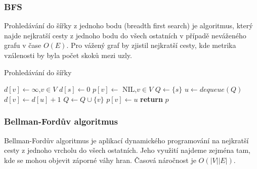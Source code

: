 \documentclass[12pt,titlepage]{report}
\begin{document}
\subsubsection{BFS}
Prohledávání do šířky z jednoho bodu (breadth first search) je algoritmus,
který najde nejkratší cesty z jednoho bodu do všech ostatních v případě
neváženého grafu v čase $O(E)$. Pro vážený graf by zjistil nejkratší cesty, kde
metrika vzálenosti by byla počet skoků mezi uzly.

\begin{center}
\begin{minipage}{\textwidth}
\begin{algorithm}[H]
	\caption{Prohledávání do šířky}
		\label{alg:bfs}
	\begin{algorithmic}[1]
	\Statex
		\State $d[v] \gets \infty$,$v \in V$
		\State $d[s] \gets 0$
		\State $p[v] \gets $ NIL,$v \in V$
		\State $Q \gets \{s\}$
			\State $u \gets dequeue(Q)$
					\State $d[v] \gets d[u] + 1$
					\State $Q \gets Q \cup \{v\}$
					\State $p[v] \gets u$
				\EndIf
			\EndFor
		\EndWhile
		\State \textbf{return} $p$
	\EndFunction
	\end{algorithmic}
\end{algorithm}
\end{minipage}
\end{center}
\mbox{}

\subsubsection{Bellman-Fordův algoritmus}
Bellman-Fordův algoritmus je aplikací dynamického programování na nejkratší
cesty z jednoho vrcholu do všech ostatních. Jeho využití najdeme zejména tam,
kde se mohou objevit záporné váhy hran. Časová náročnost je $O(|V||E|)$.
\end{document}
